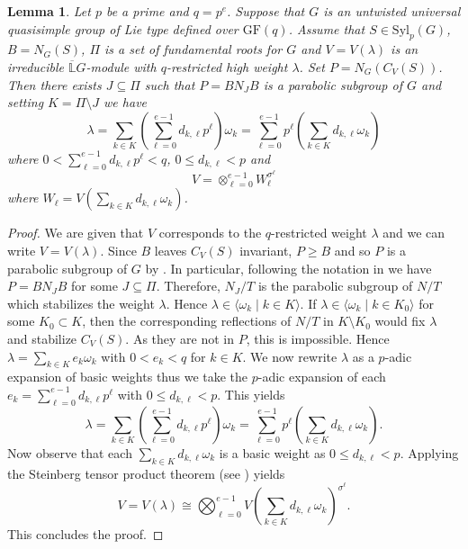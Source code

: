 \documentclass[12pt]{amsart}
\newtheorem{lemma}[theorem]{Lemma}
\theoremstyle{remark}
\theoremstyle{notation}
\theoremstyle{definition}
\newcommand{\Syl}{\mathrm{Syl}}\newcommand{\syl}{\mathrm{Syl}}
\newcommand{\GF}{\mathrm{GF}}
\newcommand{\0}{\emptyset}
\begin{document}
\begin{lemma}\label{high weights} Let $p$ be a prime and $q=p^e$. Suppose that $G$ is an untwisted universal quasisimple group of Lie type defined over $\GF(q)$.
Assume that  $S \in \Syl_p(G)$, $B=N_G(S)$, $\Pi$ is a set of fundamental roots for $G$ and  $V=V(\lambda)$ is an irreducible $\overline{\mathbb L}G$-module with $q$-restricted high weight $\lambda$.  Set $P= N_G(C_V(S))$. Then there exists $J \subseteq \Pi$ such that $P=BN_JB$ is a parabolic subgroup of $G$ and  setting $K=\Pi \setminus J$ we have $$\lambda= \sum_{k\in K}   (\sum_{\ell=0}^{e-1}d_{k,\ell}p^\ell)\omega_k=
 \sum_{\ell=0}^{e-1}p^\ell(\sum_{k\in K} d_{k,\ell}\omega_k)$$ where $0<\sum_{\ell=0}^{e-1}d_{k,\ell}p^\ell< q$,  $0\le d_{k,\ell}<p$  and $$V=    \otimes_{\ell=0}^{e-1} W_\ell^{\sigma^{ \ell}}$$ where $W_\ell= V\left(\sum_{k\in K} d_{k,\ell}\omega_k\right)$.
\end{lemma}

 \begin{proof} We are given that $V$ corresponds to the $q$-restricted weight $\lambda$ and we can write $V=V(\lambda)$. Since $B$ leaves $C_V(S)$ invariant, $P\ge B$ and so $P$ is a parabolic subgroup of $G$ by \cite[Theorem 8.3.2 ]{Carter}.    In particular, following the notation in \cite[Proposition 8.2.2]{Carter}  we have $P=BN_JB$ for some $J \subseteq \Pi$. Therefore, $N_J/T$ is the parabolic subgroup of $N/T$ which stabilizes the weight $\lambda$. Hence $\lambda\in \langle \omega_k\mid k \in K\rangle$. If $ \lambda\in \langle \omega_k\mid k \in K_0\rangle$ for some $K_0 \subset K$, then the corresponding reflections of $N/T$ in $K\setminus K_0$ would fix $\lambda$ and stabilize $C_V(S)$.  As they are not in $P$, this is impossible.  Hence $\lambda = \sum_{k\in K} e_{k} \omega_k$ with $0< e_{k}< q$ for $k \in K$.    We now rewrite $\lambda$ as a $p$-adic expansion of basic weights thus we take the $p$-adic expansion of each $e_{k}= \sum_{\ell=0}^{e-1}d_{k,\ell}p^\ell $ with $0\le d_{k,\ell}<p$. This yields
 $$\lambda= \sum_{k\in K}   (\sum_{\ell=0}^{e-1}d_{k,\ell}p^\ell)\omega_k=
 \sum_{\ell=0}^{e-1}p^\ell(\sum_{k\in K} d_{k,\ell}\omega_k).$$
Now observe that each $\sum_{k\in K} d_{k,\ell}\omega_k$ is a basic weight as $0\le d_{k,\ell}<p$. Applying the Steinberg tensor product theorem (see \cite[II.3.17 Corollary]{Jantzen}) yields $$V=V(\lambda) \cong \bigotimes_{\ell=0}^{e-1} V\left(\sum_{k\in K} d_{k,\ell}\omega_k\right)^{\sigma^{ \ell}}.$$
This concludes the proof.
\end{proof}
\end{document}
